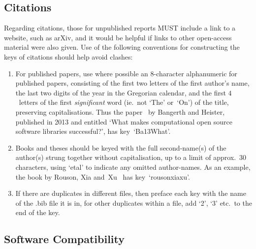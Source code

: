 \subsection{Citations}\label{sec:REF_citations}
Regarding citations, those for unpublished reports MUST include a link to a
website, such as arXiv, and it would be helpful if links to other open-access
material were also given.
Use of the following conventions for constructing the keys of citations should help avoid clashes:
\begin{enumerate}
\item For published papers, use where possible an $8$-character alphanumeric for published papers,
consisting of the first two letters of the first author's name, the last two digits
of the year in the Gregorian calendar, and the first $4$~letters of the first \emph{significant}
word (ie.\ not `The' or~`On') of the title, preserving capitalisations.
Thus the paper~\cite{Ba13What} by Bangerth and Heister, published in 2013 and
entitled `What makes computational open source software libraries successful?',
has key~`Ba13What'.
\item Books and theses should be keyed with the full second-name(s) of the author(s) strung together
without capitalisation, up to a limit of approx.~$30$ characters, using `etal'
to indicate any omitted author-names. As an example, the book by Rouson, Xia
and~Xu~\cite{rousonxiaxu} has key~`rousonxiaxu'.
\item If there are duplicates in different files, then preface
each key with the name of the .bib file it is in, for other duplicates within a file,
add `2', `3' etc.\ to the end of the key.
\end{enumerate}

\subsection{Software Compatibility}\label{sec:REF_compat}


\clearpage
{}


\clearpage
{}

